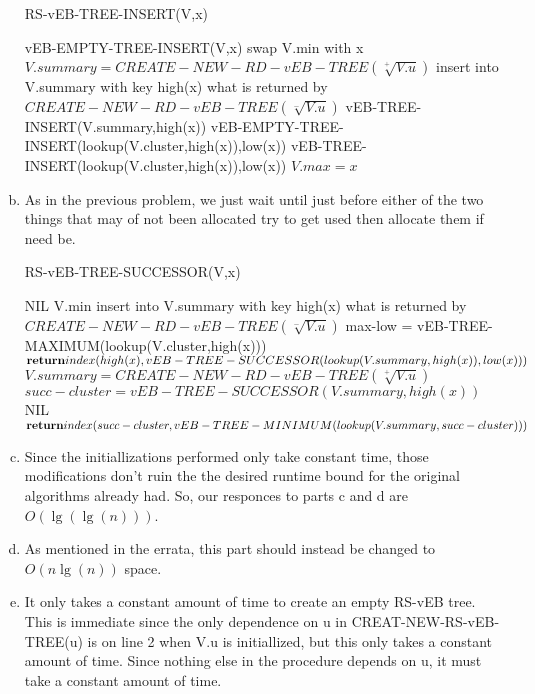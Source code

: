 \documentclass{article}
\begin{document}
\begin{enumerate}[a.]
\begin{algorithm}
\caption{RS-vEB-TREE-INSERT(V,x)}
\begin{algorithmic}
\State vEB-EMPTY-TREE-INSERT(V,x)
\Else
	\State swap V.min with x
	\EndIf
	\State $V.summary = CREATE-NEW-RD-vEB-TREE(\sqrt[+]{V.u})$
	\EndIf
	\State insert into V.summary with key high(x) what is returned by $CREATE-NEW-RD-vEB-TREE(\sqrt[-]{V.u})$
	\EndIf
	\State vEB-TREE-INSERT(V.summary,high(x))
	\State vEB-EMPTY-TREE-INSERT(lookup(V.cluster,high(x)),low(x))
	\Else
	\State vEB-TREE-INSERT(lookup(V.cluster,high(x)),low(x))
	\EndIf
	\EndIf
	\State $V.max = x$
	\EndIf
\EndIf
\end{algorithmic}
\end{algorithm}

\item

As in the previous problem, we just wait until just before either of the two things that may of not been allocated try to get used then allocate them if need be.
\begin{algorithm}
\caption{RS-vEB-TREE-SUCCESSOR(V,x)}
\begin{algorithmic}
\State {}
\Else
\State \Return NIL
\EndIf
{}
\State\Return V.min
\Else
{}
\State insert into V.summary with key high(x) what is returned by $CREATE-NEW-RD-vEB-TREE(\sqrt[-]{V.u})$
\EndIf
\State max-low = vEB-TREE-MAXIMUM(lookup(V.cluster,high(x)))
\State $\Return index(high(x),vEB-TREE-SUCCESSOR(lookup(V.summary,high(x)),low(x)))$
\Else
{}
\State $V.summary = CREATE-NEW-RD-vEB-TREE(\sqrt[+]{V.u})$
\EndIf
\State $succ-cluster = vEB-TREE-SUCCESSOR(V.summary,high(x))$
\State\Return NIL
\Else
\State $\Return index(succ-cluster,vEB-TREE-MINIMUM(lookup(V.summary,succ-cluster)))$
\EndIf
\EndIf
\EndIf
\end{algorithmic}
\end{algorithm}

\item
Since the initiallizations performed only take constant time, those modifications don't ruin the the desired runtime bound for the original algorithms already had. So, our responces to parts c and d are $O(\lg(\lg(n)))$.

\item
As mentioned in the errata, this part should instead be changed to $O(n\lg(n))$ space.


\item
It only takes a constant amount of time to create an empty RS-vEB tree. This is immediate since the only dependence on u in CREAT-NEW-RS-vEB-TREE(u) is on line 2 when V.u is initiallized, but this only takes a constant amount of time. Since nothing else in the procedure depends on u, it must take a constant amount of time.
\end{enumerate}
\end{document}
